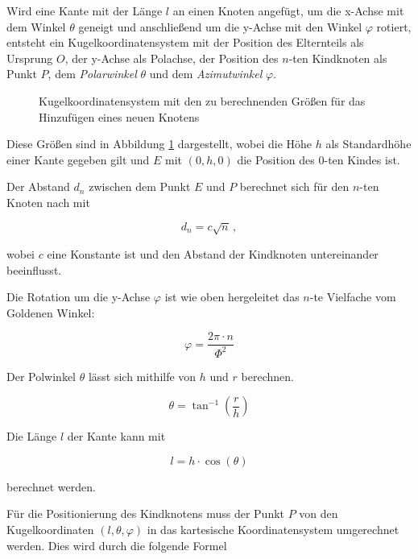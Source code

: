 Wird eine Kante mit der Länge $l$ an einen Knoten angefügt, um die x-Achse mit dem Winkel $\theta$ geneigt und anschließend um die y-Achse mit den Winkel $\varphi$ rotiert, entsteht ein Kugelkoordinatensystem mit der Position des Elternteils als Ursprung $O$, der y-Achse als Polachse, der Position des $n$-ten Kindknoten als Punkt $P$, dem \emph{Polarwinkel} $\theta$ und dem \emph{Azimutwinkel} $\varphi$\cite{papula2001mathematik}.

\begin{figure}[htb]
  
  \caption{Kugelkoordinatensystem mit den zu berechnenden Größen für das Hinzufügen eines neuen Knotens}
  \label{fig:spherical-coordinates}
\end{figure}

Diese Größen sind in Abbildung \ref{fig:spherical-coordinates} dargestellt, wobei die Höhe $h$ als Standardhöhe einer Kante gegeben gilt und $E$ mit $(0, h, 0)$ die Position des $0$-ten Kindes ist.

Der Abstand $d_n$ zwischen dem Punkt $E$ und $P$ berechnet sich für den $n$-ten Knoten nach \cite{vogel1979better} mit

\begin{equation}
\label{eq:r}
  d_n = c \sqrt{n}\,,
\end{equation}

wobei $c$ eine Konstante ist und den Abstand der Kindknoten untereinander beeinflusst.

Die Rotation um die y-Achse $\varphi$ ist wie oben hergeleitet das $n$-te Vielfache vom Goldenen Winkel:

\begin{equation}
  \varphi = \frac{2\pi \cdot n}{\Phi^{2}}
\end{equation}

Der Polwinkel $\theta$ lässt sich mithilfe von $h$ und $r$ berechnen.

\begin{equation}
  \theta = \tan^{-1} \left(\frac{r}{h}\right)
\end{equation}

Die Länge $l$ der Kante kann mit

\begin{equation}
  l = h \cdot \cos\left(\theta\right)
\end{equation}

berechnet werden.

Für die Positionierung des Kindknotens muss der Punkt $P$ von den Kugelkoordinaten $(l, \theta, \varphi)$ in das kartesische Koordinatensystem umgerechnet werden. Dies wird durch die folgende Formel

